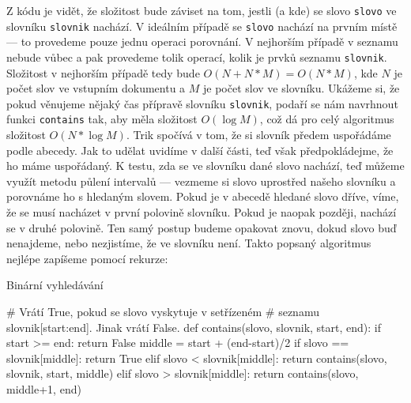 Z kódu je vidět, že složitost bude záviset na tom, jestli (a kde) se slovo {\tt slovo} ve slovníku {\tt slovnik} nachází. V ideálním
případě se {\tt slovo} nachází na prvním místě --- to provedeme pouze jednu operaci porovnání. V nejhorším případě v seznamu
nebude vůbec a pak provedeme tolik operací, kolik je prvků seznamu {\tt slovnik}. Složitost v nejhorším případě tedy bude $O(N+N*M) = O(N*M)$, kde
$N$ je počet slov ve vstupním dokumentu a $M$ je počet slov ve slovníku. Ukážeme si, že pokud věnujeme nějaký čas přípravě slovníku {\tt slovnik},
podaří se nám navrhnout funkci {\tt contains} tak, aby měla složitost $O(\log M)$, což dá pro celý algoritmus složitost $O(N*\log M)$.
Trik spočívá v tom, že si slovník předem uspořádáme podle abecedy. Jak to udělat uvidíme v další části, teď však předpokládejme, že
ho máme uspořádaný. K testu, zda se ve slovníku dané slovo nachází, teď můžeme využít metodu půlení intervalů --- vezmeme si 
slovo uprostřed našeho slovníku a porovnáme ho s hledaným slovem. Pokud je v abecedě hledané slovo dříve, víme, že se musí
nacházet v první polovině slovníku. Pokud je naopak později, nachází se v druhé polovině. Ten samý postup budeme opakovat znovu,
dokud slovo buď nenajdeme, nebo nezjistíme, že ve slovníku není. Takto popsaný algoritmus nejlépe zapíšeme pomocí rekurze:

\begin{program}\caption{Binární vyhledávání}
\begin{python}
# Vrátí True, pokud se slovo vyskytuje v setřízeném 
# seznamu slovnik[start:end]. Jinak vrátí False.
def contains(slovo, slovnik, start, end):
  if start >= end:
    return False
  middle = start + (end-start)/2
  if slovo == slovnik[middle]:
    return True
  elif slovo < slovnik[middle]:
    return contains(slovo, slovnik, start, middle)
  elif slovo > slovnik[middle]:
    return contains(slovo, middle+1, end)
\end{python}
\end{program}

